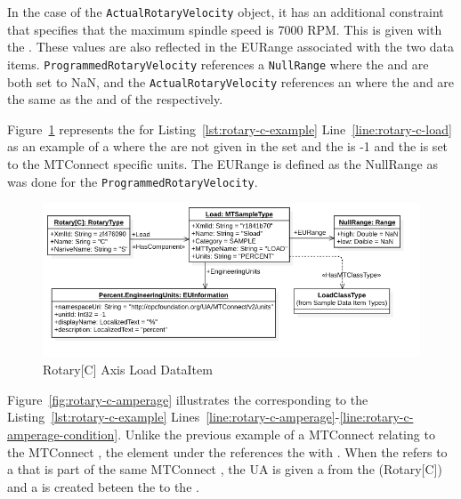 In the case of the \texttt{ActualRotaryVelocity} object, it has an additional constraint that specifies that the maximum spindle speed is 7000 RPM. This is given with the . These values are also reflected in the EURange associated with the two data items. \texttt{ProgrammedRotaryVelocity} references a \texttt{NullRange} where the  and  are both set to NaN, and the \texttt{ActualRotaryVelocity} references an  where the  and  are the same as the  and  of the  respectively. 

\FloatBarrier

Figure~\ref{fig:rotary-c-load} represents the   for Listing~\ref{lst:rotary-c-example} Line~\ref{line:rotary-c-load} as an example of a  where the  are not given in the  set and the  is -1 and the  is set to the MTConnect specific units. The EURange is defined as the NullRange as was done for the \texttt{ProgrammedRotaryVelocity}.

\begin{figure}[ht]
    \centering
    \includegraphics[width=1.0\textwidth]{diagrams/mtconnect-mapping/rotary-c-load.png}
    \caption{Rotary[C] Axis Load DataItem}
    \label{fig:rotary-c-load}
\end{figure}

\FloatBarrier

Figure~\ref{fig:rotary-c-amperage} illustrates the   corresponding to the Listing~\ref{lst:rotary-c-example} Lines~\ref{line:rotary-c-amperage}-\ref{line:rotary-c-amperage-condition}. Unlike the previous example of a MTConnect  relating to the MTConnect , the  element under the  references the  with  . When the  refers to a  that is part of the same MTConnect , the UA  is given a   from the  (Rotary[C]) and a   is created beteen the  to the .

